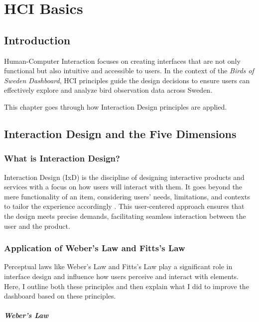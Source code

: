 \chapter{HCI Basics}

\section{Introduction}

Human-Computer Interaction focuses on creating interfaces that are not only functional but also intuitive and accessible to users. In the context of the \textit{Birds of Sweden Dashboard}, HCI principles guide the design decisions to ensure users can effectively explore and analyze bird observation data across Sweden.

This chapter goes through how Interaction Design principles are applied.

\section{Interaction Design and the Five Dimensions}

\subsection{What is Interaction Design?}

Interaction Design (IxD) is the discipline of designing interactive products and services with a focus on how users will interact with them. It goes beyond the mere functionality of an item, considering users' needs, limitations, and contexts to tailor the experience accordingly \cite{WhatInteractionDesign2024}. This user-centered approach ensures that the design meets precise demands, facilitating seamless interaction between the user and the product.

\subsection{Application of Weber's Law and Fitts's Law}

Perceptual laws like Weber's Law and Fitts's Law play a significant role in interface design and influence how users perceive and interact with elements. Here, I outline both these principles and then explain what I did to improve the dashboard based on these principles.

\paragraph{Weber's Law}

